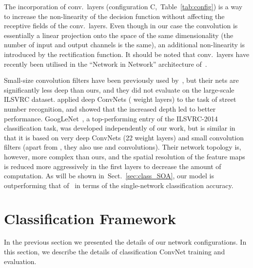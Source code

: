 \documentclass{article} \usepackage{iclr2015,times}
\newcommand{\tblref}[1]{Table~\ref{#1}}
\newcommand{\sref}[1]{Sect.~\ref{#1}}
\begin{document}
The incorporation of  conv.\ layers (configuration C,~\tblref{tab:config}) is a way to increase the non-linearity of the decision function without affecting
the receptive fields of the conv.\ layers. Even though in our case the  convolution is essentially a linear projection onto the space of the same dimensionality 
(the number of input and output channels is the same), an additional non-linearity is introduced by the rectification function.
It should be noted that  conv.\ layers have recently been utilised in the ``Network in Network'' architecture of~\citet{Lin14}.

Small-size convolution filters have been previously used by~\citet{Ciresan11}, but their nets are significantly less deep than ours, and they did not
evaluate on the large-scale ILSVRC dataset. 
\citet{Goodfellow13} applied deep ConvNets ( weight layers) to the task of street number recognition, and showed that the increased depth led to better performance.
GoogLeNet~\citep{Szegedy14}, a top-performing entry of the ILSVRC-2014 classification task, was developed independently of our work, but is similar in that it is based on very deep ConvNets (22 weight layers) and small convolution filters (apart from , they also use  and \mbox{} convolutions). Their network topology is, however, more complex than ours, and the spatial resolution of the feature maps is reduced more aggressively in the first layers to decrease the amount of computation. As will be shown in~\sref{sec:class_SOA}, our model is outperforming that of~\citet{Szegedy14} in terms of the single-network classification accuracy.

\section{Classification Framework}
\label{sec:learning}
In the previous section we presented the details of our network configurations. In this section, we describe the details of classification ConvNet training and evaluation.
\end{document}
